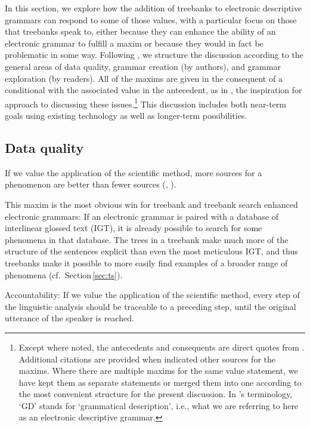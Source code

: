 \documentclass[12pt]{article}
\newcommand{\sref}[1]{Section$\,$\ref{#1}}
\begin{document}
In this section, we explore how the addition of treebanks to
electronic descriptive grammars can respond to some of those values,
with a particular focus on those that treebanks speak to, either
because they can enhance the ability of an electronic grammar to
fulfill a maxim or because they would in fact be problematic in some
way.  Following \citeauthor{Nordhoff:08}, we structure the discussion
according to the general areas of data quality, grammar creation (by
authors), and grammar exploration (by readers).  All of the maxims are
given in the consequent of a conditional with the associated value in
the antecedent, as in , the inspiration for
 approach to discussing these
issues.\footnote{Except where noted, the antecedents and consequents
  are direct quotes from .  Additional
  citations are provided when \citeauthor{Nordhoff:08} indicated other
  sources for the maxims.  Where there are multiple maxims for the
  same value statement, we have kept them as separate statements or
  merged them into one according to the most convenient structure for
  the present discussion. In \citeauthor{Nordhoff:08}'s terminology,
  `GD' stands for `grammatical description', i.e., what we are
  referring to here as an electronic descriptive grammar.}  This
discussion includes both near-term goals using existing technology as
well as longer-term possibilities.

\subsection{Data quality}

\begin{exe}
 If we value the application of the
scientific method, more sources for a phenomenon are better than
fewer sources (, ).
\end{exe}

This maxim is the most obvious win for treebank and treebank
search enhanced electronic grammars: If an electronic grammar
is paired with a database of interlinear glossed text (IGT), it
is already possible to search for some phenomena in that database.
The trees in a treebank make much more of the structure of the
sentences explicit than even the most meticulous IGT, and thus
treebanks make it possible to more easily find examples of a broader
range of phenomena (cf.\ \sref{sec:ts}).

\begin{exe}
\ex\label{ex:ou} {\sc Accountability:} If we value the application of the
scientific method, every step of the linguistic analysis should be
traceable to a preceding step, until the original utterance of the
speaker is reached.
\end{exe}
\end{document}
